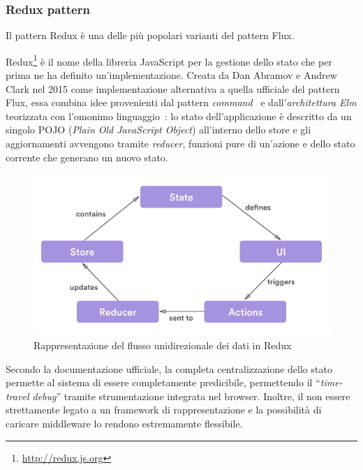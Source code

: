 \subsubsection{Redux pattern}

Il pattern Redux è una delle più popolari varianti del pattern Flux.

Redux\footnote{\url{http://redux.js.org}} è il nome della libreria JavaScript per la gestione dello stato che per prima ne ha definito un'implementazione.
Creata da Dan Abramov e Andrew Clark nel 2015 come implementazione alternativa a quella ufficiale del pattern Flux,
essa combina idee provenienti dal pattern \emph{command}~\cite{10.5555/186897} e dall'\emph{architettura Elm} teorizzata con l'omonimo linguaggio~\cite{czaplicki2012elm}:
lo stato dell'applicazione è descritto da un singolo POJO (\emph{Plain Old JavaScript Object}) all'interno dello store e gli aggiornamenti avvengono tramite \emph{reducer}, funzioni pure di un'azione e dello stato corrente che generano un nuovo stato.

\begin{figure}[htbp]
  \centering
  \includegraphics[width=.9\textwidth]{res/fig/redux-diagram.png}
  \caption{Rappresentazione del flusso unidirezionale dei dati in Redux}%
  \label{fig:redux}
\end{figure}

Secondo la documentazione ufficiale, la completa centralizzazione dello stato permette al sistema di essere completamente predicibile, permettendo il ``\emph{time-travel debug}'' tramite strumentazione integrata nel browser.
Inoltre, il non essere strettamente legato a un framework di rappresentazione e la possibilità di caricare middleware lo rendono estremamente flessibile.
